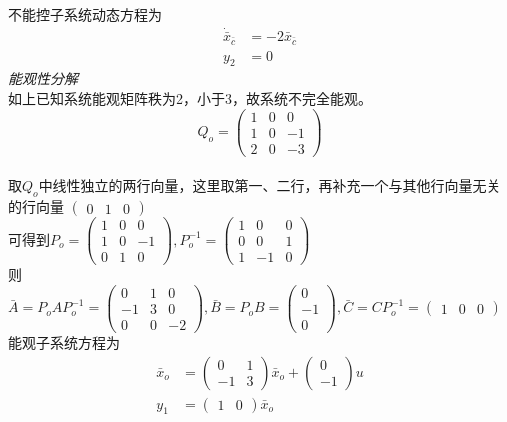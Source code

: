 \documentclass[a4paper]{article}
\begin{document}
不能控子系统动态方程为
\begin{align*}
\dot{\bar{x}}_{\bar{c}} &= -2\bar{x}_{\bar{c}} \\
y_{2} &= 0
\end{align*}
\emph{能观性分解}\\
如上已知系统能观矩阵秩为2，小于3，故系统不完全能观。\\
$$ Q_{o}= \left(\begin{array}{ccc} 1 & 0 & 0\\ 1 & 0 & -1\\ 2 & 0 & -3 \end{array}\right)$$ \\
取$Q_{o}$中线性独立的两行向量，这里取第一、二行，再补充一个与其他行向量无关的行向量 $\left(\begin{array}{ccc} 0 & 1 & 0 \end{array}\right)$ \\
可得到$ P_{o}= \left(\begin{array}{ccc} 1 & 0 & 0\\ 1 & 0 & -1\\ 0 & 1 & 0 \end{array}\right), P_{o}^{-1}=\left(\begin{array}{ccc} 1 & 0 & 0\\ 0 & 0 & 1\\ 1 & -1 & 0 \end{array}\right)$ \\
则$ \bar{A}=P_{o}AP_{o}^{-1}= \left(\begin{array}{ccc} 0 & 1 & 0\\ -1 & 3 & 0\\ 0 & 0 & -2 \end{array}\right),
\bar{B}=P_{o}B= \left(\begin{array}{c} 0\\ -1\\ 0 \end{array}\right),
\bar{C}=CP_{o}^{-1}= \left(\begin{array}{ccc} 1 & 0 & 0 \end{array}\right)$ \\
能观子系统方程为\\
\begin{align*}
\bar{x}_{o} &= \left(\begin{array}{cc} 0 & 1\\ -1 & 3 \end{array}\right)\bar{x}_{o}+\left(\begin{array}{c} 0\\ -1 \end{array}\right)u \\
y_1 &= \left(\begin{array}{cc} 1 & 0 \end{array}\right)\bar{x}_o
\end{align*}
\end{document}
